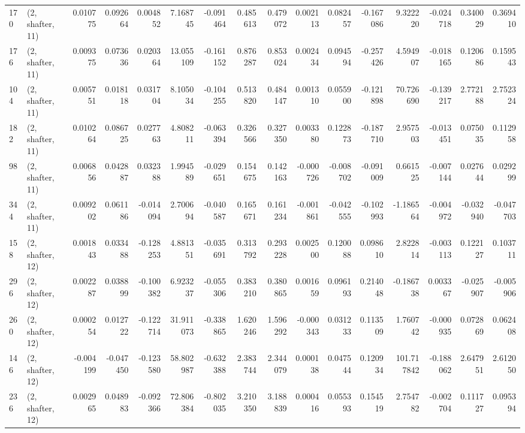 \begin{tabular}{llrrrrrrrrrrrrrr}
170 &  (2, shafter, 11) &   0.010775 &  0.092664 &  0.004852 &    7.168745 & -0.091464 &   0.485613 &  0.479072 &  0.002113 &  0.082457 & -0.167086 &     9.322220 & -0.024718 &  0.340029 &  0.369410 \\
176 &  (2, shafter, 11) &   0.009375 &  0.073636 &  0.020364 &   13.055109 & -0.161152 &   0.876287 &  0.853024 &  0.002434 &  0.094594 & -0.257426 &     4.594907 & -0.018165 &  0.120686 &  0.159543 \\
104 &  (2, shafter, 11) &   0.005751 &  0.018118 &  0.031704 &    8.105034 & -0.104255 &   0.513820 &  0.484147 &  0.001310 &  0.055900 & -0.121898 &    70.726690 & -0.139217 &  2.772188 &  2.752324 \\
182 &  (2, shafter, 11) &   0.010264 &  0.086725 &  0.027763 &    4.808211 & -0.063394 &   0.326566 &  0.327350 &  0.003380 &  0.122873 & -0.187710 &     2.957503 & -0.013451 &  0.075035 &  0.112958 \\
98  &  (2, shafter, 11) &   0.006856 &  0.042887 &  0.032388 &    1.994589 & -0.029651 &   0.154675 &  0.142163 & -0.000726 & -0.008702 & -0.091009 &     0.661525 & -0.007144 &  0.027644 &  0.029299 \\
344 &  (2, shafter, 11) &   0.009202 &  0.061186 & -0.014094 &    2.700694 & -0.040587 &   0.165671 &  0.161234 & -0.001861 & -0.042555 & -0.102993 &    -1.186564 & -0.004972 & -0.032940 & -0.047703 \\
158 &  (2, shafter, 12) &   0.001843 &  0.033488 & -0.128253 &    4.881351 & -0.035691 &   0.313792 &  0.293228 &  0.002500 &  0.120088 &  0.098610 &     2.822814 & -0.003113 &  0.122127 &  0.103711 \\
296 &  (2, shafter, 12) &   0.002287 &  0.038899 & -0.100382 &    6.923237 & -0.055306 &   0.383210 &  0.380865 &  0.001659 &  0.096193 &  0.214048 &    -0.186738 &  0.003367 & -0.025907 & -0.005906 \\
260 &  (2, shafter, 12) &   0.000254 &  0.012722 & -0.122714 &   31.911073 & -0.338865 &   1.620246 &  1.596292 & -0.000343 &  0.031233 &  0.113509 &     1.760742 & -0.000935 &  0.072869 &  0.062408 \\
146 &  (2, shafter, 12) &  -0.004199 & -0.047450 & -0.123580 &   58.802987 & -0.632388 &   2.383744 &  2.344079 &  0.000138 &  0.047544 &  0.120934 &   101.717842 & -0.188062 &  2.647951 &  2.612050 \\
236 &  (2, shafter, 12) &   0.002965 &  0.048983 & -0.092366 &   72.806384 & -0.802035 &   3.210350 &  3.188839 &  0.000416 &  0.055393 &  0.154519 &     2.754782 & -0.002704 &  0.111727 &  0.095394 \\

\end{tabular}

